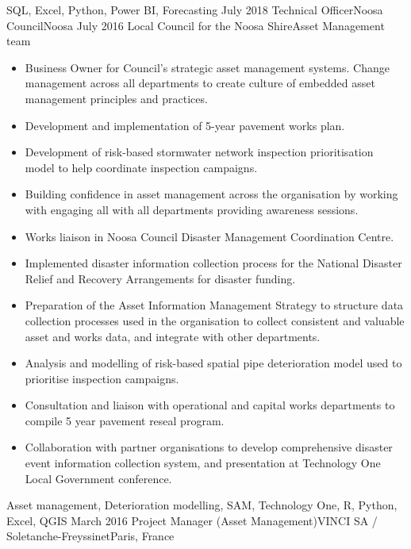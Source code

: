 \begin{experiences}
{\begin{itemize}
                      \end{itemize}
                    }
                    {SQL, Excel, Python, Power BI, Forecasting}
  \emptySeparator
  \consultantexperience
    {July 2018} {Technical Officer}{Noosa Council}{Noosa}
    {July 2016}   {Local Council for the Noosa Shire}{Asset Management team}
      {
                      \begin{itemize}
                        \item Business Owner for Council's strategic asset management systems. Change management across all departments to create culture of embedded asset management principles and practices.
		\item Development and implementation of 5-year pavement works plan.
		\item Development of risk-based stormwater network inspection prioritisation model to help coordinate inspection campaigns.
		\item Building confidence in asset management across the organisation by working with engaging all with all departments providing awareness sessions.
		\item Works liaison in Noosa Council Disaster Management Coordination Centre.
		\item Implemented disaster information collection process for the National Disaster Relief and Recovery Arrangements for disaster funding.
		\item Preparation of the Asset Information Management Strategy to structure data collection processes used in the organisation to collect consistent and valuable asset and works data, and integrate with other departments.
		\item Analysis and modelling of risk-based spatial pipe deterioration model used to prioritise inspection campaigns.
		\item Consultation and liaison with operational and capital works departments to compile 5 year pavement reseal program.
		\item Collaboration with partner organisations to develop comprehensive disaster event information collection system, and presentation at Technology One Local Government conference.                                                      
                      \end{itemize}
                    }
                    {Asset management, Deterioration modelling, SAM, Technology One, R, Python, Excel, QGIS}
  \emptySeparator
  \consultantexperience
    {March 2016}     {Project Manager (Asset Management)}{VINCI SA / Soletanche-Freyssinet}{Paris, France}

\end{experiences}
